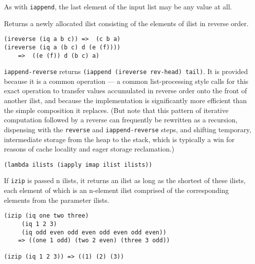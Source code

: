 \begin{description}
As with \texttt{iappend}, the last element of the input list may be any
value at all.
\item[ \href{}{} \texttt{ireverse~} ilist -\textgreater{} ilist ]
Returns a newly allocated ilist consisting of the elements of ilist in
reverse order.

\begin{verbatim}
(ireverse (iq a b c)) =>  (c b a)
(ireverse (iq a (b c) d (e (f))))
    =>  ((e (f)) d (b c) a)
\end{verbatim}
\item[ \href{}{} \texttt{iappend-reverse~~}rev-head tail -\textgreater{}
ilist ]
\texttt{iappend-reverse} returns
\texttt{(iappend\ (ireverse\ rev-head)\ tail)}. It is provided because
it is a common operation --- a common list-processing style calls for
this exact operation to transfer values accumulated in reverse order
onto the front of another ilist, and because the implementation is
significantly more efficient than the simple composition it replaces.
(But note that this pattern of iterative computation followed by a
reverse can frequently be rewritten as a recursion, dispensing with the
\texttt{reverse} and \texttt{iappend-reverse} steps, and shifting
temporary, intermediate storage from the heap to the stack, which is
typically a win for reasons of cache locality and eager storage
reclamation.) \href{}{}
\item[\texttt{izip} ilist\textsubscript{1} ilist\textsubscript{2}
\ldots{} -\textgreater{} ilist ]
\begin{verbatim}
(lambda ilists (iapply imap ilist ilists))
\end{verbatim}

If \texttt{izip} is passed n ilists, it returns an ilist as long as the
shortest of these ilists, each element of which is an n-element ilist
comprised of the corresponding elements from the parameter ilists.

\begin{verbatim}
(izip (iq one two three) 
     (iq 1 2 3)
     (iq odd even odd even odd even odd even))
    => ((one 1 odd) (two 2 even) (three 3 odd))

(izip (iq 1 2 3)) => ((1) (2) (3))
\end{verbatim}


\end{description}
